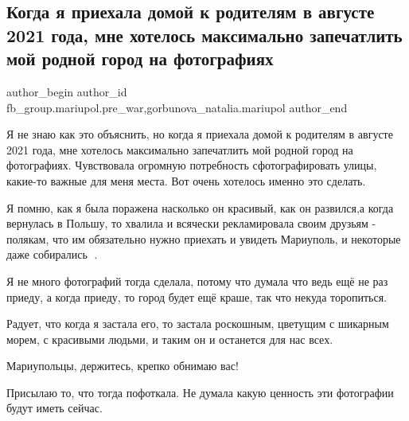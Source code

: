  
 
 
 
 

\subsection{Когда я приехала домой к родителям в августе 2021 года, мне хотелось максимально запечатлить мой родной город на фотографиях}
\label{sec:20_02_2023.fb.fb_group.mariupol.pre_war.1.kogda_ya_priekhala_d}
 
\ifcmt
 author_begin
   author_id fb_group.mariupol.pre_war,gorbunova_natalia.mariupol
 author_end
\fi

Я не знаю как это объяснить, но когда я приехала домой к родителям в августе
2021 года, мне хотелось максимально запечатлить мой родной город на
фотографиях. Чувствовала огромную потребность сфотографировать улицы, какие-то
важные для меня места. Вот очень хотелось именно это сделать. 

Я помню, как я была поражена насколько он красивый, как он развился,а когда
вернулась в Польшу, то хвалила и всячески рекламировала своим друзьям -
полякам, что им обязательно нужно приехать и увидеть Мариуполь, и некоторые
даже собирались 🙂.

Я не много фотографий тогда сделала, потому что думала что ведь ещё не раз
приеду, а когда приеду, то город будет ещё краше, так что некуда торопиться. 

Радует, что когда я застала его, то застала роскошным, цветущим с шикарным
морем, с красивыми людьми, и таким он и останется для нас всех.

Мариупольцы, держитесь, крепко обнимаю вас!

Присылаю то, что тогда пофоткала. Не думала какую ценность эти фотографии будут
иметь сейчас.

